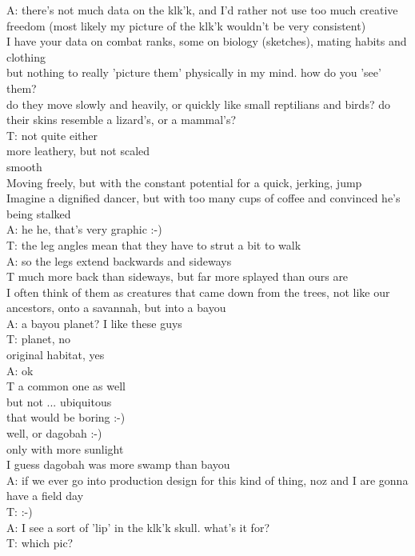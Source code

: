 A: there's not much data on the klk'k, and I'd rather not use too much creative freedom (most likely my picture of the klk'k wouldn't be very consistent)\\
I have your data on combat ranks, some on biology (sketches), mating habits and clothing\\
but nothing to really 'picture them' physically in my mind. how do you 'see' them?\\
 do they move slowly and heavily, or quickly like small reptilians and birds? do their skins resemble a lizard's, or a mammal's?\\
T: not quite either\\
more leathery, but not scaled\\
smooth\\
Moving freely, but with the constant potential for a quick, jerking, jump\\
Imagine a dignified dancer, but with too many cups of coffee and convinced he's being stalked\\
A: he he, that's very graphic :-)\\
T: the leg angles mean that they have to strut a bit to walk\\
A: so the legs extend backwards and sideways\\
T much more back than sideways, but far more splayed than ours are\\
I often think of them as creatures that came down from the trees, not like our ancestors, onto a savannah, but into a bayou\\
A: a bayou planet? I like these guys\\
T: planet, no\\
original habitat, yes\\
A: ok\\
T a common one as well\\
but not ... ubiquitous\\
that would be boring :-)\\
well, or dagobah :-)\\
only with more sunlight\\
I guess dagobah was more swamp than bayou\\
A: if we ever go into production design for this kind of thing, noz and I are gonna have a field day\\
T: :-)\\
A: I see a sort of 'lip' in the klk'k skull. what's it for?\\
T: which pic?\\

